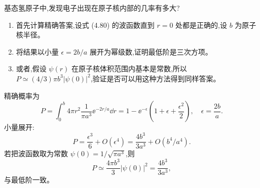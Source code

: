 \begin{question}
基态氢原子中,发现电子出现在原子核内部的几率有多大?
\begin{enumerate}
\item 首先计算精确答案,设式 (4.80) 的波函数直到 $r=0$ 处都是正确的,设 $b$ 为原子核半径。
\item 将结果以小量 $\epsilon=2b/a$ 展开为幂级数,证明最低阶是三次方项。
\item 或者,假设 $\psi(r)$ 在原子核体积范围内基本是常数,所以 $P\simeq(4/3)\pi b^3|\psi(0)|^2$,验证是否可以用这种方法得到同样答案。
\end{enumerate}

\par\smallskip
{}

\begin{solution}

精确概率为
\[
P=\int_0^b4\pi r^2\frac{1}{\pi a^3}\ee^{-2r/a}\dd r
=1-\ee^{-\epsilon}\left(1+\epsilon+\frac{\epsilon^2}{2}\right),
\quad \epsilon=\frac{2b}{a}.
\]
小量展开:
\[
P=\frac{\epsilon^3}{6}+O(\epsilon^4)=\frac{4b^3}{3a^3}+O(b^4/a^4).
\]
若把波函数取为常数 $\psi(0)=1/\sqrt{\pi a^3}$,则
\[
P\simeq \frac{4\pi b^3}{3}|\psi(0)|^2=\frac{4b^3}{3a^3},
\]
与最低阶一致。

\end{solution}
\end{question}

